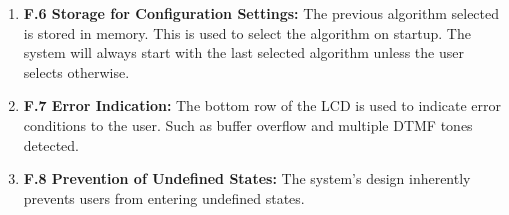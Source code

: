 \documentclass{cce2014-design}
\begin{document}
{{\begin{enumerate}
		        system there is no way to enter
		        an undefined or unsafe state. The system will always
		        start in the calibrator
		        and the user will have to calibrate before using it. On
		        hardware interrupts the
		        user is returned back to this stage.
		  \item \textbf{F.6 Storage for Configuration Settings:}
		        The previous algorithm selected is stored in memory.
		        This is used to select the
		        algorithm on startup. The system will always start with
		        the last selected
		        algorithm unless the user selects otherwise.
		  \item \textbf{F.7 Error Indication:} The bottom row of
		        the LCD is used to indicate error conditions to the
		        user. Such as buffer
		        overflow and multiple DTMF tones detected.
		  \item \textbf{F.8 Prevention of Undefined States:} The
		        system's design inherently prevents users from entering
		        undefined states.
	  \end{enumerate}
  }
 }


\end{document}
